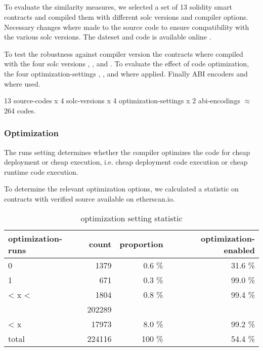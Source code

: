 \documentclass[../main.tex]{subfiles}
\begin{document}
\subsection{\n{\solcts} \label{sec:solcts}}
To evaluate the similarity measures, we selected a set of 13 solidity smart contracts and compiled
them with different solc versions and compiler options.
Necessary changes where made to the source code to ensure compatibility with the various solc
versions.
The dateset and code is available online \cite{solc-versions-testset}.

To test the robustness against compiler version the contracts where compiled with the four solc versions , ,  and .
To evaluate the effect of code optimization, the four optimization-settings , ,  and  where applied.
Finally ABI encoders  and  where used.

13 source-codes x 4 solc-versions x 4 optimization-settings x 2 abi-encodings $\approx$ 264 codes.

\subsubsection{Optimization}
The runs setting determines whether the compiler optimizes the code for cheap deployment or cheap execution, i.e. cheap deployment code execution or cheap runtime code execution.

To determine the relevant optimization options, we calculated a statistic  on contracts with verified source available on etherscan.io.

\begin{table*}[ht]
  \centering
  \scriptsize
  \begin{tabular}{lrrr}
    optimization-runs & count  & proportion           & optimization-enabled \\
    \hline
    0                 & 1379   & 0.6 \%               & 31.6 \%              \\
    1                 & 671    & 0.3 \%               & 99.0 \%              \\
    < x <             & 1804   & 0.8 \%               & 99.4 \%              \\
    \color{red}{200}  & 202289 & \color{red}{90.3 \%} & \color{red}{50.0 \%} \\
    < x               & 17973  & 8.0 \%               & 99.2 \%              \\
    \hline
    total             & 224116 & 100 \%               & 54.4 \%
  \end{tabular}
  \caption{optimization setting statistic}
  \label{tbl:opti_stat}
\end{table*}
\end{document}
